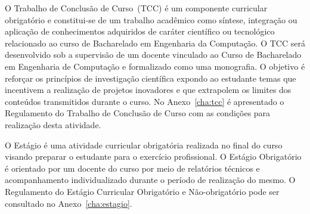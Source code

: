 O Trabalho de Conclusão de Curso~(TCC) é um componente curricular obrigatório e constitui-se de um trabalho acadêmico como síntese, integração ou aplicação de conhecimentos adquiridos de caráter científico ou tecnológico relacionado ao curso de Bacharelado em Engenharia da Computação. O TCC será desenvolvido sob a supervisão de um docente vinculado ao Curso de Bacharelado em Engenharia de Computação e formalizado como uma monografia. O objetivo é reforçar os princípios de investigação científica expondo ao estudante temas que incentivem a realização de projetos inovadores e que extrapolem os limites dos conteúdos transmitidos durante o curso. No Anexo~\ref{cha:tcc} é apresentado o Regulamento do Trabalho de Conclusão de Curso com as condições para realização desta atividade.

O Estágio é uma atividade curricular obrigatória realizada no final do curso visando preparar o estudante para o exercício profissional. O Estágio Obrigatório é orientado por um docente do curso por meio de relatórios técnicos e acompanhamento individualizado durante o período de realização do mesmo. O Regulamento do Estágio Curricular Obrigatório e Não-obrigatório pode ser consultado no Anexo~\ref{cha:estagio}.




